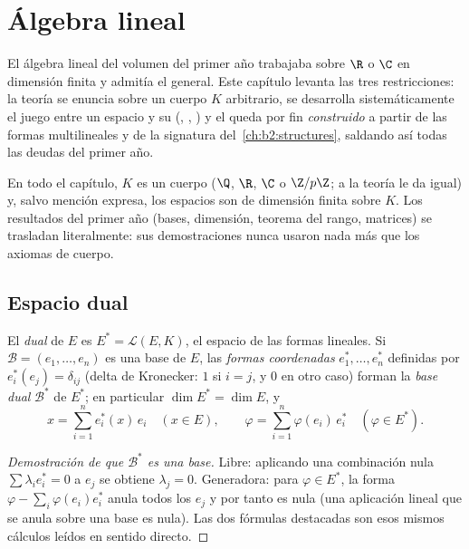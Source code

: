 \chapter{Álgebra lineal}\label{ch:b2:linalg}

El álgebra lineal del volumen del primer año trabajaba sobre $\R$ o
$\C$ en dimensión finita y admitía el  general. Este
capítulo levanta las tres restricciones: la teoría se enuncia sobre un
cuerpo $K$ arbitrario, se desarrolla sistemáticamente el juego entre un
espacio y su \emph{} (, ,
) y el  queda por fin \emph{construido} a
partir de las formas multilineales  y de la signatura del~\cref{ch:b2:structures}, saldando así todas las deudas del primer año.

En todo el capítulo, $K$ es un cuerpo ($\Q$, $\R$, $\C$ o $\Z/p\Z$; a
la teoría le da igual) y, salvo mención expresa, los espacios son de
dimensión finita sobre $K$. Los resultados del primer año (bases,
dimensión, teorema del rango, matrices) se trasladan literalmente: sus
demostraciones nunca usaron nada más que los axiomas de cuerpo.

\section{Espacio dual}

\begin{definition}\label{def:b2:linalg:dual}
El \emph{dual} de $E$ es $E^* = \mathcal{L}(E,
K)$, el espacio de las formas lineales. Si $\mathcal{B} = (e_1, \dots,
e_n)$ es una base de $E$, las \emph{formas coordenadas} $e_1^*, \dots,
e_n^*$ definidas por $e_i^*(e_j) = \delta_{ij}$ (delta de Kronecker:
$1$ si $i = j$, y $0$ en otro caso) forman la \emph{base
dual} $\mathcal{B}^*$ de $E^*$; en particular $\dim
E^* = \dim E$, y
\[
x = \sum_{i=1}^{n} e_i^*(x)\, e_i \quad (x \in E),
\qquad
\varphi = \sum_{i=1}^{n} \varphi(e_i)\, e_i^* \quad (\varphi \in
E^*).
\]
\end{definition}

\begin{proof}[Demostración de que $\mathcal{B}^*$ es una base]
Libre: aplicando una combinación nula $\sum \lambda_i e_i^* = 0$ a
$e_j$ se obtiene $\lambda_j = 0$. Generadora: para $\varphi \in E^*$,
la forma $\varphi - \sum_i \varphi(e_i) e_i^*$ anula todos los $e_j$ y
por tanto es nula (una aplicación lineal que se anula sobre una base
es nula). Las dos fórmulas destacadas son esos mismos cálculos leídos
en sentido directo.
\end{proof}

